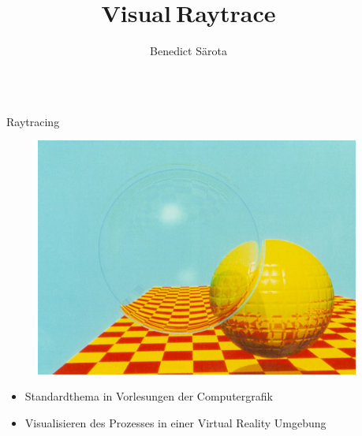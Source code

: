 \documentclass[final,hyperref={pdfpagelabels=false}]{beamer}
\title{\huge Visual$\:$Raytrace}
\author{Benedict S\"arota}
\institute{Fachbereich Informatik und Mikrosystemtechnik}
\begin{document}

\begin{frame}[t] %

\begin{columns}[t] %

\begin{column}{.025\textwidth}\end{column} %

\begin{column}{.465\textwidth} %


\begin{block}{Raytracing}
    \begin{figure}
    	\center
        \includegraphics[width=0.775\linewidth]{whitted02}
    \end{figure}
    

	\begin{itemize}
	 	\item Standardthema in Vorlesungen der Computergrafik 
	 	\item Visualisieren des Prozesses in einer Virtual Reality Umgebung
	\end{itemize}


\end{block}
\end{column}
\end{columns}
\end{frame}
\end{document}
